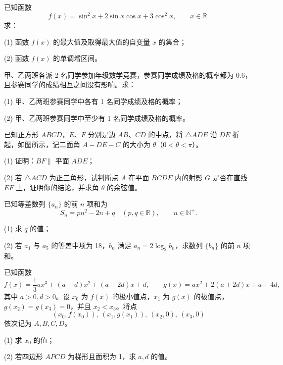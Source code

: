\begin{question}
已知函数
\nopagebreak[4]
\[
f(x)=\sin^2x+2\sin x\cos x+3\cos^2x,\qquad x\in\mathbb R.
\]
求：

(1) 函数 \(f(x)\) 的最大值及取得最大值的自变量 \(x\) 的集合；

(2) 函数 \(f(x)\) 的单调增区间。

\end{question}
\begin{question}
甲、乙两班各派 2 名同学参加年级数学竞赛，参赛同学成绩及格的概率都为 0.6，且参赛同学的成绩相互之间没有影响。求：

(1) 甲、乙两班参赛同学中各有 1 名同学成绩及格的概率；

(2) 甲、乙两班参赛同学中至少有 1 名同学成绩及格的概率。

\Needspace{0.4\textheight}
\end{question}
\begin{question}
已知正方形 \(ABCD\)，\(E\)、\(F\) 分别是边 \(AB\)、\(CD\) 的中点，将 \(\triangle ADE\) 沿 \(DE\) 折起，如图所示，记二面角 \(A-DE-C\) 的大小为 \(\theta\)（\(0<\theta<\pi\)）。

(1) 证明：\(BF\parallel\) 平面 \(ADE\)；

(2) 若 \(\triangle ACD\) 为正三角形，试判断点 \(A\) 在平面 \(BCDE\) 内的射影 \(G\) 是否在直线 \(EF\) 上，证明你的结论，并求角 \(\theta\) 的余弦值。
\nopagebreak[4]
\begin{center}\end{center}
\nopagebreak[4]
\end{question}
\begin{question}
已知等差数列 \(\{a_n\}\) 的前 \(n\) 项和为
\nopagebreak[4]
\[
S_n=pn^2-2n+q\quad(p,q\in\mathbb R),\qquad n\in\mathbb N^+.
\]

(1) 求 \(q\) 的值；

(2) 若 \(a_1\) 与 \(a_5\) 的等差中项为 18，\(b_n\) 满足 \(a_n=2\log_2b_n\)，求数列 \(\{b_n\}\) 的前 \(n\) 项和。

\end{question}
\begin{question}
已知函数
\nopagebreak[4]
\[
f(x)=\frac13ax^3+(a+d)x^2+(a+2d)x+d,\qquad
g(x)=ax^2+2(a+2d)x+a+4d,
\]
其中 \(a>0,d>0\)。设 \(x_0\) 为 \(f(x)\) 的极小值点，\(x_1\) 为 \(g(x)\) 的极值点，\(g(x_2)=g(x_3)=0\)，并且 \(x_2<x_3\)。将点
\nopagebreak[4]
\[
(x_0,f(x_0)),\ (x_1,g(x_1)),\ (x_2,0),\ (x_3,0)
\]
依次记为 \(A,B,C,D\)。

(1) 求 \(x_0\) 的值；

(2) 若四边形 \(APCD\) 为梯形且面积为 1，求 \(a,d\) 的值。

\end{question}
